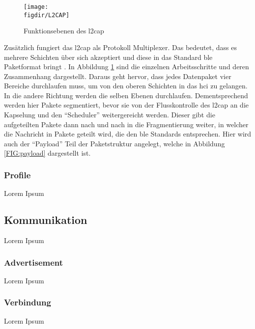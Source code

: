 \begin{figure}[h]
	\centering
	\texttt{[image: \\figdir/L2CAP]}
	\caption{Funktionsebenen des \ac{l2cap} \cite{TI:WWW}}
	\label{FIG:l2cap}
\end{figure}

\noindent Zusätzlich fungiert das \ac{l2cap} als Protokoll Multiplexer. Das bedeutet, dass es mehrere Schichten über sich akzeptiert und diese in das Standard \ac{ble} Paketformat bringt \cite[Seite 25]{Townsend14:GSB}. In Abbildung \ref{FIG:l2cap} sind die einzelnen Arbeitsschritte und deren Zusammenhang dargestellt. Daraus geht hervor, dass jedes Datenpaket vier Bereiche durchlaufen muss, um von den oberen Schichten in das \ac{hci} zu gelangen. In die andere Richtung werden die selben Ebenen durchlaufen. Dementsprechend werden hier Pakete segmentiert, bevor sie von der Flusskontrolle des \ac{l2cap} an die Kapselung und den "`Scheduler"' weitergereicht werden. Dieser gibt die aufgeteilten Pakete dann nach und nach in die Fragmentierung weiter, in welcher die Nachricht in Pakete geteilt wird, die den \ac{ble} Standards entsprechen. Hier wird auch der "`Payload"' Teil der Paketstruktur angelegt, welche in Abbildung \ref{FIG:payload} dargestellt ist.\\       

\subsubsection{Profile}
\label{sss:funktionsweise:profiles}

Lorem Ipsum

\subsection{Kommunikation}
\label{ss:funktionsweise:kommunkation}

Lorem Ipsum

\subsubsection{Advertisement}
\label{sss:funktionsweise:advertisement}

Lorem Ipsum

\subsubsection{Verbindung}
\label{sss:funktionsweise:verbindung}

Lorem Ipsum


